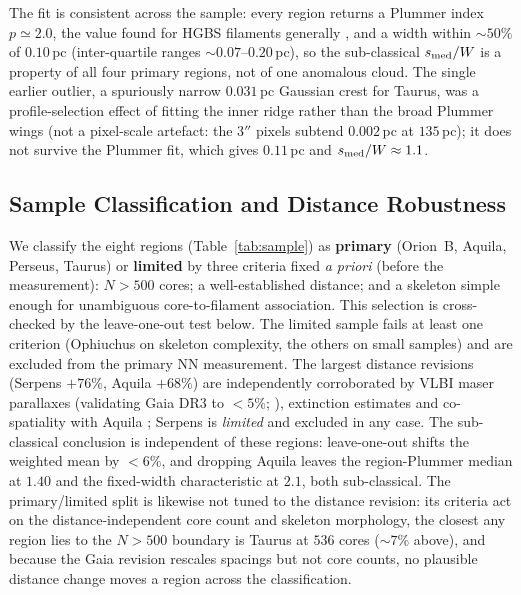 \documentclass[usenatbib,twoside,twocolumn]{mnras}
\begin{document}
The fit is consistent across the sample: every region returns a Plummer index $p\simeq2.0$, the value found for HGBS filaments generally \citep{Arzoumanian2019}, and a width within $\sim50\%$ of $0.10$\,pc (inter-quartile ranges $\sim0.07$--$0.20$\,pc), so the sub-classical $s_{\rm med}/W$ is a property of all four primary regions, not of one anomalous cloud. The single earlier outlier, a spuriously narrow $0.031$\,pc Gaussian crest for Taurus, was a profile-selection effect of fitting the inner ridge rather than the broad Plummer wings (not a pixel-scale artefact: the $3''$ pixels subtend $0.002$\,pc at $135$\,pc); it does not survive the Plummer fit, which gives $0.11$\,pc and $s_{\rm med}/W\approx1.1$.

\subsection{Sample Classification and Distance Robustness}
\label{sec:distance_uncertainties}

We classify the eight regions (Table~\ref{tab:sample}) as \textbf{primary} (Orion~B, Aquila, Perseus, Taurus) or \textbf{limited} by three criteria fixed \emph{a priori} (before the measurement): $N>500$ cores; a well-established distance; and a skeleton simple enough for unambiguous core-to-filament association. This selection is cross-checked by the leave-one-out test below. The limited sample fails at least one criterion (Ophiuchus on skeleton complexity, the others on small samples) and are excluded from the primary NN measurement. The largest distance revisions (Serpens $+76\%$, Aquila $+68\%$) are independently corroborated by VLBI maser parallaxes (validating Gaia DR3 to $<5\%$; \citealt{Kounkel2018,Xu2021,OrtizLeon2018,OrtizLeon2017}), extinction estimates \citep{Yan2022,Green2024} and co-spatiality with Aquila \citep{Zucker2020}; Serpens is \emph{limited} and excluded in any case. The sub-classical conclusion is independent of these regions: leave-one-out shifts the weighted mean by $<6\%$, and dropping Aquila leaves the region-Plummer median at $1.40$ and the fixed-width characteristic at $2.1$, both sub-classical. The primary/limited split is likewise not tuned to the distance revision: its criteria act on the distance-independent core count and skeleton morphology, the closest any region lies to the $N>500$ boundary is Taurus at $536$ cores ($\sim7\%$ above), and because the Gaia revision rescales spacings but not core counts, no plausible distance change moves a region across the classification.
\end{document}
